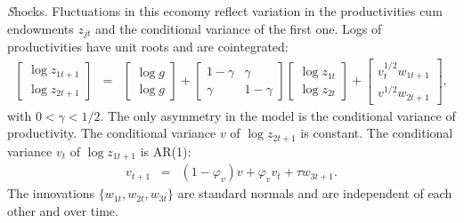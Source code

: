 {\textit Shocks.\/}
Fluctuations in this economy reflect variation in
the productivities cum endowments $z_{jt}$ and the conditional variance of the first one.
Logs of productivities have unit roots and are cointegrated:
\begin{eqnarray}
    \left[
    \begin{array}{c}
    \log z_{1t+1} \\ \log z_{2t+1}
    \end{array}
    \right]
    &=&
    \left[
    \begin{array}{c}
    \log g \\ \log g
    \end{array}
    \right] +
    \left[
    \begin{array}{cc}
    1-\gamma & \gamma \\ \gamma & 1-\gamma
    \end{array}
    \right]
    \left[
    \begin{array}{c}
    \log z_{1t} \\ \log z_{2t}
    \end{array}
    \right] +
    \left[
    \begin{array}{c}
    v_t^{1/2} w_{1t+1} \\ v^{1/2} w_{2t+1}
    \end{array}
    \right] ,
    \label{eq:lom-z}
\end{eqnarray}
with $0 < \gamma < 1/2$.
The only asymmetry in the model is the conditional variance
of productivity.
The conditional variance $v$ of $\log z_{2t+1}$ is constant.
The conditional variance $v_t$ of $\log z_{1t+1}$ is AR(1):
\begin{eqnarray}
        v_{t+1} &=& (1-\varphi_v) v + \varphi_v v_t + \tau w_{3t+1} .
        \label{eq:lom-v}
\end{eqnarray}
The innovations $\{ w_{1t}, w_{2t}, w_{3t} \} $ are standard normals
and are independent of each other and over time.
